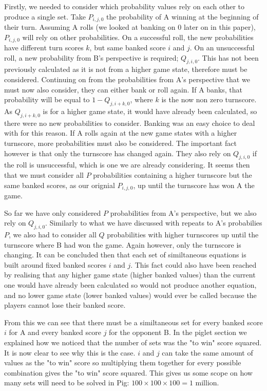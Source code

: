 \documentclass[a4paper,titlepage]{article}
\begin{document}
Firstly, we needed to consider which probability values rely on each other to produce a single set. Take $P_{i,j,0}$ the probability of A winning at the beginning of their turn. Assuming A rolls (we looked at banking on 0 later on in this paper), $P_{i,j,0}$ will rely on other probabilities. On a successful roll, the new probabilities have different turn scores $k$, but same banked score $i$ and $j$. On an unsuccessful roll, a new probability from B's perspective is required; $Q_{j,i,0}$. This has not been previously calculated as it is not from a higher game state, therefore must be considered. Continuing on from the probabilities from A's perspective that we must now also consider, they can either bank or roll again. If A banks, that probability will be equal to $1-Q_{j,i+k,0}$, where $k$ is the now non zero turnscore. As $Q_{j,i+k,0}$ is for a higher game state, it would have already been calculated, so there were no new probabilities to consider. Banking was an easy choice to deal with for this reason. If A rolls again at the new game states with a higher turnscore, more probabilities must also be considered. The important fact however is that only the turnscore has changed again. They also rely on $Q_{j,i,0}$ if the roll is unsuccessful, which is one we are already considering. It seems then that we must consider all $P$ probabilities containing a higher turnscore but the same banked scores, as our orignial $P_{i,j,0}$, up until the turnscore has won A the game.

So far we have only considered $P$ probabilities from A's perspective, but we also rely on $Q_{j,i,0}$. Similarly to what we have discussed with repeats to A's probabilies $P$, we also had to consider all $Q$ probabilities with higher turnscores up until the turnscore where B had won the game. Again however, only the turnscore is changing. It can be concluded then that each set of similtaneous equations is built around fixed banked scores $i$ and $j$. This fact could also have been reached by realising that any higher game state (higher banked values) than the current one would have already been calculated so would not produce another equation, and no lower game state (lower banked values) would ever be called because the players cannot lose their banked score.

From this we can see that there must be a similtaneous set for every banked score $i$ for A and every banked score $j$ for the opponent B. In the piglet section we explained how we noticed that the number of sets was the "to win" score squared. It is now clear to see why this is the case. $i$ and $j$ can take the same amount of values as the "to win" score so multiplying them together for every possible combination gives the "to win" score squared. This gives us some scope on how many sets will need to be solved in Pig: $100\times100\times100=1$ million.
\end{document}
